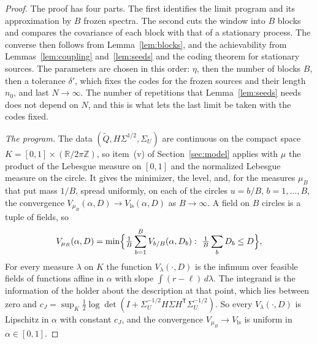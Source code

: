 \documentclass[11pt,onecolumn]{IEEEtran}
\newcommand{\R}{\mathbb{R}}
\newcommand{\Vls}{V_{\mathrm{ls}}}
\begin{document}
\begin{proof}
The proof has four parts. The first identifies the limit program and
its approximation by $B$ frozen spectra. The second cuts the window
into $B$ blocks and compares the covariance of each block with that of
a stationary process. The converse then follows from
Lemma~\ref{lem:blocks}, and the achievability from
Lemmas~\ref{lem:coupling} and~\ref{lem:seeds} and the coding theorem
for stationary sources. The parameters are chosen in this order:
$\eta$, then the number of blocks $B$, then a tolerance $\delta'$, which
fixes the codes for the frozen sources and their length $n_0$, and
last $N\to\infty$. The number of repetitions that Lemma~\ref{lem:seeds}
needs does not depend on $N$, and this is what lets the last limit be
taken with the codes fixed.

\emph{The program.} The data $(\tilde Q,H\Sigma^{1/2},\Sigma_U)$ are
continuous on the compact space
$K=[0,1]\times(\R/2\pi\mathbb Z)$, so item~(v) of
Section~\ref{sec:model} applies with $\mu$ the product of the Lebesgue
measure on $[0,1]$ and the normalized Lebesgue measure on the circle.
It gives the minimizer, the level, and, for the measures $\mu_B$ that
put mass $1/B$, spread uniformly, on each of the circles $u=b/B$,
$b=1,\dots,B$, the
convergence $V_{\mu_B}(\alpha,D)\to\Vls(\alpha,D)$ as $B\to\infty$. A
field on $B$ circles is a tuple of fields, so
\begin{equation}
V_{\mu_B}(\alpha,D)=\min\Bigl\{\tfrac1B\sum_{b=1}^BV_{b/B}(\alpha,D_b):\ \tfrac1B\sum_bD_b\le D\Bigr\},
\label{eq:vB}
\end{equation}
For every measure $\lambda$ on $K$ the function
$V_\lambda(\cdot,D)$ is the infimum over feasible fields of functions
affine in $\alpha$ with slope $\int(r-\ell)\,d\lambda$. The integrand
is the information of the holder about the description at that point,
which lies between zero and
$c_J=\sup_K\tfrac12\log\det(I+\Sigma_U^{-1/2}H\Sigma H^{\mathsf T}\Sigma_U^{-1/2})$.
So every $V_\lambda(\cdot,D)$ is Lipschitz in $\alpha$ with constant
$c_J$, and the convergence $V_{\mu_B}\to\Vls$ is uniform in
$\alpha\in[0,1]$.


\end{proof}
\end{document}
